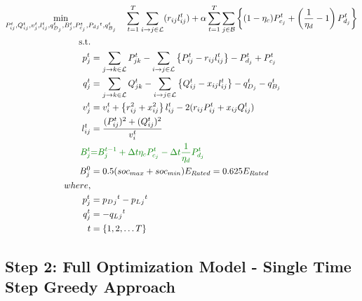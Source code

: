 \begin{gather}
    \min_{P_{ij}^t, Q_{ij}^t, v_{j}^t, l_{ij}^t, q_{D_j}^t, B_{j}^{t},
	P_{c_j}^t, P_d{_j}^t, q_{B_j}^t} \quad
	\sum_{t = 1}^{T} \sum_{\fromto{i, j} \in \mathcal{L}} (r_{ij}l_{ij}^t) + 
	\alpha \sum_{t = 1}^{T} \sum_{j \in \mathcal{B}} \left\{ (1- \eta_c)P_{c_j}^t + \left(\frac{1}{\eta_d}-1\right) P_{d_j}^t \right\} \\
	\begin{align}
		\text{s.t.} & {}\nonumber \\
		{p_j^t} & = {\sum_{\fromto{j,k} \in \mathcal{L}} P_{jk}^t - \sum_{\fromto{i,j} \in \mathcal{L}}\left\{P_{ij}^t - r_{ij}l_{ij}^t\right\} - P_{d_j}^t + P_{c_j}^t} && \\
		{q_j^t} & = {\sum_{\fromto{j,k} \in \mathcal{L}} Q_{jk}^t - \sum_{\fromto{i,j} \in \mathcal{L}}\left\{Q_{ij}^t - x_{ij}l_{ij}^t\right\} - q_{D_j}^t - q_{B_j}^t} && \\
		{v_j^t} & = {v_{i}^t +  \left\{r_{ij}^2 + x_{ij}^2\right\}l_{ij}^t - 2(r_{ij}P_{ij}^t + x_{ij}Q_{ij}^t)} && \\
		{l_{ij}^t} & = {\frac{(P_{ij}^{t})^2 + (Q_{ij}^{t})^2}{v_i^t}} \\
		{\color{darkgreen}{ B_{j}^{t} }} &\color{darkgreen}{=} { \color{darkgreen}{ B_{j}^{t-1} + \Delta t  \eta_c P_{c_j}^t - \Delta t\frac{1}{\eta_d} P_{d_j}^t } } \\
		{ B_{j}^{0} } &= { 0.5(soc_{max}+soc_{min})E_{Rated} = 0.625E_{Rated}} \\
		{where,} & {} \\
		{p_j^t} &= {p_D{_j}^t - p_L{_j}^t} \\
		{q_j^t} &= {-q_L{_j}^t} \\
		{t} &= {\{1, 2, \ldots T\}}
	\end{align}
\end{gather}

\subsection*{Step 2: Full Optimization Model - Single Time Step Greedy Approach}


